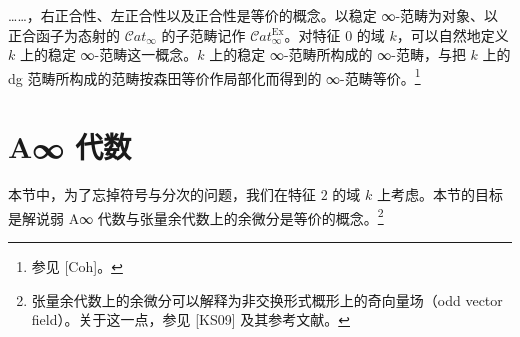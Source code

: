 
……，右正合性、左正合性以及正合性是等价的概念。以稳定 ∞-范畴为对象、以正合函子为态射的 $\mathcal{C}at_\infty$ 的子范畴记作 $\mathcal{C}at^{\mathrm{Ex}}_\infty$。对特征 $0$ 的域 $k$，可以自然地定义 $k$ 上的稳定 ∞-范畴这一概念。$k$ 上的稳定 ∞-范畴所构成的 ∞-范畴，与把 $k$ 上的 dg 范畴所构成的范畴按森田等价作局部化而得到的 ∞-范畴等价。\footnote{参见 [Coh]。}

\section{A∞ 代数}

本节中，为了忘掉符号与分次的问题，我们在特征 $2$ 的域 $k$ 上考虑。本节的目标是解说弱 A∞ 代数与张量余代数上的余微分是等价的概念。\footnote{张量余代数上的余微分可以解释为非交换形式概形上的奇向量场（odd vector field）。关于这一点，参见 [KS09] 及其参考文献。}

